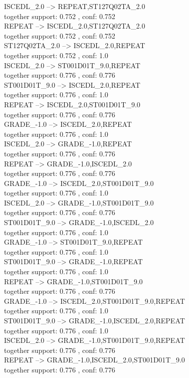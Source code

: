 \documentclass[12pt, a4paper, oneside]{ctexart}
\begin{document}
ISCEDL\_2.0 --> REPEAT,ST127Q02TA\_2.0 \\
together support: 0.752 , conf: 0.752 \\
REPEAT --> ISCEDL\_2.0,ST127Q02TA\_2.0 \\
together support: 0.752 , conf: 0.752\\
ST127Q02TA\_2.0 --> ISCEDL\_2.0,REPEAT \\
together support: 0.752 , conf: 1.0 \\
ISCEDL\_2.0 --> ST001D01T\_9.0,REPEAT \\
 together support: 0.776 , conf: 0.776 \\
ST001D01T\_9.0 --> ISCEDL\_2.0,REPEAT \\
 together support: 0.776 , conf: 1.0 \\
REPEAT --> ISCEDL\_2.0,ST001D01T\_9.0 \\
 together support: 0.776 , conf: 0.776 \\
GRADE\_-1.0 --> ISCEDL\_2.0,REPEAT \\
 together support: 0.776 , conf: 1.0 \\
ISCEDL\_2.0 --> GRADE\_-1.0,REPEAT \\
 together support: 0.776 , conf: 0.776 \\
REPEAT --> GRADE\_-1.0,ISCEDL\_2.0 \\
 together support: 0.776 , conf: 0.776 \\
GRADE\_-1.0 --> ISCEDL\_2.0,ST001D01T\_9.0 \\
together support: 0.776 , conf: 1.0 \\
ISCEDL\_2.0 --> GRADE\_-1.0,ST001D01T\_9.0 \\
 together support: 0.776 , conf: 0.776 \\
ST001D01T\_9.0 --> GRADE\_-1.0,ISCEDL\_2.0 \\
together support: 0.776 , conf: 1.0 \\
GRADE\_-1.0 --> ST001D01T\_9.0,REPEAT \\
together support: 0.776 , conf: 1.0 \\
ST001D01T\_9.0 --> GRADE\_-1.0,REPEAT \\
together support: 0.776 , conf: 1.0 \\
REPEAT --> GRADE\_-1.0,ST001D01T\_9.0 \\
 together support: 0.776 , conf: 0.776 \\
GRADE\_-1.0 --> ISCEDL\_2.0,ST001D01T\_9.0,REPEAT \\
together support: 0.776 , conf: 1.0 \\
ST001D01T\_9.0 --> GRADE\_-1.0,ISCEDL\_2.0,REPEAT \\
 together support: 0.776 , conf: 1.0 \\
ISCEDL\_2.0 --> GRADE\_-1.0,ST001D01T\_9.0,REPEAT \\
  together support: 0.776 , conf: 0.776 \\
REPEAT --> GRADE\_-1.0,ISCEDL\_2.0,ST001D01T\_9.0 \\
  together support: 0.776 , conf: 0.776 \\
\end{document}
